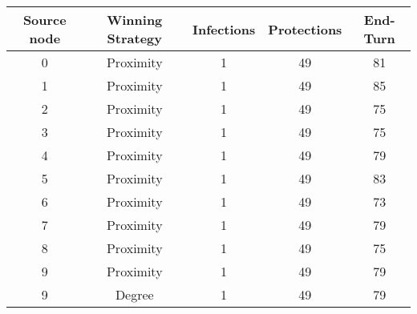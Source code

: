 \documentclass[results.tex]{subfiles}
\begin{document}
    \begin{center}
        \begin{tabular}{| c || c | c | c | c |}
            \hline
            {\bfseries Source node} & {\bfseries Winning Strategy} & {\bfseries Infections} & {\bfseries Protections}
            & {\bfseries End-Turn}
            \\  %
            \hline\hline
            0                       & Proximity                    & 1                      & 49                      & 81                   \\
            \hline
            1                       & Proximity                    & 1                      & 49                      & 85                   \\
            \hline
            2                       & Proximity                    & 1                      & 49                      & 75                   \\
            \hline
            3                       & Proximity                    & 1                      & 49                      & 75                   \\
            \hline
            4                       & Proximity                    & 1                      & 49                      & 79                   \\
            \hline
            5                       & Proximity                    & 1                      & 49                      & 83                   \\
            \hline
            6                       & Proximity                    & 1                      & 49                      & 73                   \\
            \hline
            7                       & Proximity                    & 1                      & 49                      & 79                   \\
            \hline
            8                       & Proximity                    & 1                      & 49                      & 75                   \\
            \hline
            9                       & Proximity                    & 1                      & 49                      & 79                   \\
            \hline
            9                       & Degree                       & 1                      & 49                      & 79                   \\

\end{tabular}
\end{center}
\end{document}
